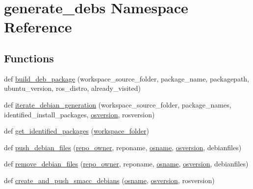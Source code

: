 \hypertarget{namespacegenerate__debs}{}\section{generate\+\_\+debs Namespace Reference}
\label{namespacegenerate__debs}
\subsection*{Functions}
\begin{DoxyCompactItemize}
\item 
def \hyperlink{namespacegenerate__debs_aa70c3f4917ddc57b13eaed8501f571a8}{build\+\_\+deb\+\_\+package} (workspace\+\_\+source\+\_\+folder, package\+\_\+name, packagepath, ubuntu\+\_\+version, ros\+\_\+distro, already\+\_\+visited)
\item 
def \hyperlink{namespacegenerate__debs_a2615a6fc7860b6aa9e920e6b4d886589}{iterate\+\_\+debian\+\_\+generation} (workspace\+\_\+source\+\_\+folder, package\+\_\+names, identified\+\_\+install\+\_\+packages, \hyperlink{namespacegenerate__debs_afd02fe6ead63bc5db5d3c3b9eb973b62}{osversion}, rosversion)
\item 
def \hyperlink{namespacegenerate__debs_aa91b87c6d9c3ed04015845cc9298431a}{get\+\_\+identified\+\_\+packages} (\hyperlink{namespacegenerate__debs_acb69863b90257249a30e43ebacfb8bd8}{workspace\+\_\+folder})
\item 
def \hyperlink{namespacegenerate__debs_a9b22f5ad65b40b7903c467eda308e575}{push\+\_\+debian\+\_\+files} (\hyperlink{namespacegenerate__debs_a74472455382c9d55ee0d75c6df6bde74}{repo\+\_\+owner}, reponame, \hyperlink{namespacegenerate__debs_ad06322332de29cb27a40152d0cccc2ca}{osname}, \hyperlink{namespacegenerate__debs_afd02fe6ead63bc5db5d3c3b9eb973b62}{osversion}, debianfiles)
\item 
def \hyperlink{namespacegenerate__debs_a08095040d038b3613ad0e77fd4e7f60e}{remove\+\_\+debian\+\_\+files} (\hyperlink{namespacegenerate__debs_a74472455382c9d55ee0d75c6df6bde74}{repo\+\_\+owner}, reponame, \hyperlink{namespacegenerate__debs_ad06322332de29cb27a40152d0cccc2ca}{osname}, \hyperlink{namespacegenerate__debs_afd02fe6ead63bc5db5d3c3b9eb973b62}{osversion}, debianfiles)
\item 
def \hyperlink{namespacegenerate__debs_af7237c463c8e5b4df369e6befc154c50}{create\+\_\+and\+\_\+push\+\_\+smacc\+\_\+debians} (\hyperlink{namespacegenerate__debs_ad06322332de29cb27a40152d0cccc2ca}{osname}, \hyperlink{namespacegenerate__debs_afd02fe6ead63bc5db5d3c3b9eb973b62}{osversion}, rosversion)
\end{DoxyCompactItemize}
